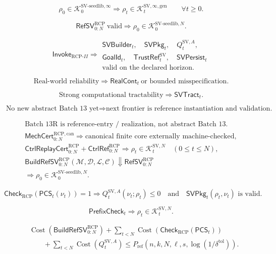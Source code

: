 \documentclass[11pt]{article}
\newcommand{\1}{\mathbf{1}}
\newcommand{\RCP}{\mathrm{RCP}}
\providecommand{\Kcal}{\mathcal{K}}
\providecommand{\Cost}{\operatorname{Cost}}
\begin{document}
\[
\rho_0\in\Kcal_0^{\mathrm{SV\mbox{-}seedlib},\infty}
\Longrightarrow
\rho_t\in\Kcal_t^{\mathrm{SV},\infty,\mathrm{gen}}
\qquad \forall t\ge0.
\]

\[
\mathsf{RefSV}_{0:N}^{\RCP}\ \text{valid}
\Longrightarrow
\rho_0\in\Kcal_0^{\mathrm{SV\mbox{-}seedlib},N}.
\]

\[
\mathsf{Invoke}_{\RCP\text{-}II}
\Longrightarrow
\begin{gathered}
\mathsf{SVBuilder}_t,\quad
\mathsf{SVPkg}_t,\quad
Q_t^{\mathrm{SV},A},\\
\mathsf{GoalId}_t,\quad
\mathsf{TrustRef}_t^{\mathrm{SV}},\quad
\mathsf{SVPersist}_t\\
\text{valid on the declared horizon.}
\end{gathered}
\]

\[
\text{Real-world reliability}
\Longrightarrow
\mathsf{RealCont}_t\ \text{or bounded misspecification.}
\]

\[
\text{Strong computational tractability}
\Longrightarrow
\mathsf{SVTract}_t.
\]

\[
\text{No new abstract Batch 13 yet}
\Longrightarrow
\text{next frontier is reference instantiation and validation.}
\]

\[
\begin{gathered}
\text{Batch 13R is reference-entry / realization, not abstract Batch 13.}\\
\mathsf{MechCert}_{0:N}^{\RCP,\mathrm{can}}\Rightarrow\text{canonical finite core externally machine-checked},\\
\mathsf{CtrlReplayCert}_{0:N}^{\RCP}+\mathsf{CtrlRef}_{0:N}^{\RCP}\Rightarrow\rho_t\in\Kcal_t^{\mathrm{SV},N}\quad(0\le t\le N),\\
\mathsf{BuildRefSV}_{0:N}^{\RCP}(\mathcal M,\mathcal D,\mathcal L,\mathcal C)
\Downarrow
\mathsf{RefSV}_{0:N}^{\RCP}\\
\Longrightarrow
\rho_0\in\Kcal_0^{\mathrm{SV\mbox{-}seedlib},N}.
\end{gathered}
\]

\[
\mathsf{Check}_{\RCP}(\mathsf{PCS}_t(\nu_t))=1
\Longrightarrow
Q_t^{\mathrm{SV},A}(\nu_t;\rho_t)\le0
\quad\text{and}\quad
\mathsf{SVPkg}_t(\rho_t,\nu_t)\text{ is valid.}
\]

\[
\mathsf{PrefixCheck}_t
\Longrightarrow
\rho_t\in\Kcal_t^{\mathrm{SV},N}.
\]

\[
\begin{aligned}
&\Cost(\mathsf{BuildRefSV}_{0:N}^{\RCP})+
\sum_{t<N}\Cost(\mathsf{Check}_{\RCP}(\mathsf{PCS}_t))\\
&\qquad+
\sum_{t<N}\Cost(Q_t^{\mathrm{SV},A})
\le
P_{\mathrm{ref}}(n,k,N,\ell,s,\log(1/\delta^{\mathrm{tol}})).
\end{aligned}
\]
\end{document}
